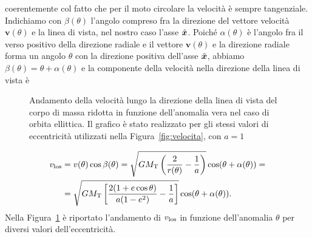 {coerentemente col fatto che per il moto circolare la velocità è sempre
tangenziale. Indichiamo con $\beta(\theta)$ l'angolo compreso fra la direzione
del vettore velocità $\bm{v}(\theta)$ e la linea di vista, nel nostro caso
l'asse $\hat{\bm{x}}$. Poiché $\alpha(\theta)$ è l'angolo fra il verso positivo
della direzione radiale e il vettore $\bm{v}(\theta)$ e la direzione radiale
forma un angolo $\theta$ con la direzione positiva dell'asse $\hat{\bm{x}}$,
abbiamo $\beta(\theta) = \theta + \alpha(\theta)$ e la componente della velocità
nella direzione della linea di vista è
\begin{figure}[tb]
  \centering
  
  \caption[Andamento della velocità nella direzione della linea di vista in
  funzione dell'anomalia
  vera]{Andamento della velocità lungo la direzione della linea di vista del
    corpo di massa ridotta in funzione dell'anomalia vera nel caso di orbita
    ellittica. Il grafico è stato realizzato per gli stessi valori di
    eccentricità utilizzati nella Figura~\ref{fig:velocita}, con $a=1$}
  \label{fig:velocita-los}
\end{figure}
\begin{equation}
  \begin{split}
    v_\textup{los} &= v(\theta)\cos\beta(\theta) = \sqrt{GM_\textup{T} \left(
      \frac{2}{r(\theta)} - \frac{1}{a}
    \right)}\cos(\theta + \alpha(\theta)) = \\
    &= \sqrt{GM_\textup{T}
    \left[
      \frac{2(1+e\cos\theta)}{a(1-e^2)} - \frac{1}{a}
    \right]}\cos(\theta + \alpha(\theta)).
  \end{split}
\end{equation}
Nella Figura~\ref{fig:velocita-los} è riportato l'andamento di $v_\textup{los}$
in funzione dell'anomalia $\theta$ per diversi valori dell'eccentricità.

}
